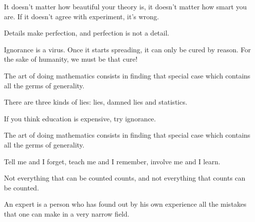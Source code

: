 \documentclass[12pt,a4paper,twoside,openright]{report}
\theoremstyle{definition}
\theoremstyle{itexmp}
\numberwithin{equation}{section}
\begin{document}
 	\begin{fquote}It doesn't matter how beautiful your theory is, it doesn't matter how smart you are. If it doesn't agree with experiment, it's wrong.
 	\end{fquote}
 	
 	\begin{fquote}Details make perfection, and perfection is not a detail.
 	\end{fquote}
 	
 	\begin{fquote}Ignorance is a virus. Once it starts spreading, it can only be cured by reason. For the sake of humanity, we must be that cure!
 	\end{fquote}
 	
 	\begin{fquote}The art of doing mathematics consists in finding that special case which contains all the germs of generality. 
 	\end{fquote}

 	\begin{fquote}There are three kinds of lies: lies, damned lies and statistics. 
 	\end{fquote}

 	\begin{fquote}If you think education is expensive, try ignorance.
 	\end{fquote}
 
  	\begin{fquote}The art of doing mathematics consists in finding that special case which contains all the germs of generality.
 	\end{fquote}
 	
 	 \begin{fquote}Tell me and I forget, teach me and I remember, involve me and I learn.
 	\end{fquote}
  	
 	 \begin{fquote}Not everything that can be counted counts, and not everything that counts can be counted.
 	\end{fquote}

 	 \begin{fquote}An expert is a person who has found out by his own experience all the mistakes that one can make in a very narrow field.
 	\end{fquote}
 	
\end{document}
